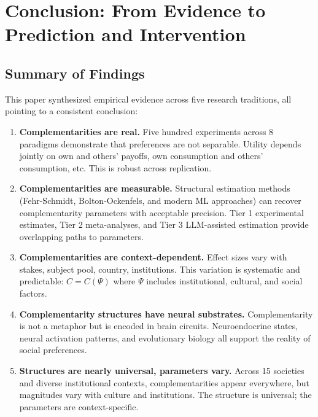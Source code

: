 \documentclass[12pt,oneside]{book}
\begin{document}
\chapter{Conclusion: From Evidence to Prediction and Intervention}
\label{ch:conclusion}

\section{Summary of Findings}

This paper synthesized empirical evidence across five research traditions, all pointing to a
consistent conclusion:

\begin{enumerate}

  \item \textbf{Complementarities are real.} Five hundred experiments across 8 paradigms
        demonstrate that preferences are not separable. Utility depends jointly on own and
        others' payoffs, own consumption and others' consumption, etc. This is robust
        across replication.

  \item \textbf{Complementarities are measurable.} Structural estimation methods
        (Fehr-Schmidt, Bolton-Ockenfels, and modern ML approaches) can recover
        complementarity parameters with acceptable precision. Tier 1 experimental
        estimates, Tier 2 meta-analyses, and Tier 3 LLM-assisted estimation provide
        overlapping paths to parameters.

  \item \textbf{Complementarities are context-dependent.} Effect sizes vary with stakes,
        subject pool, country, institutions. This variation is systematic and predictable:
        $C = C(\Psi)$ where $\Psi$ includes institutional, cultural, and social factors.

  \item \textbf{Complementarity structures have neural substrates.} Complementarity is not
        a metaphor but is encoded in brain circuits. Neuroendocrine states, neural activation
        patterns, and evolutionary biology all support the reality of social preferences.

  \item \textbf{Structures are nearly universal, parameters vary.} Across 15 societies and
        diverse institutional contexts, complementarities appear everywhere, but magnitudes
        vary with culture and institutions. The structure is universal; the parameters are
        context-specific.

\end{enumerate}
\end{document}
